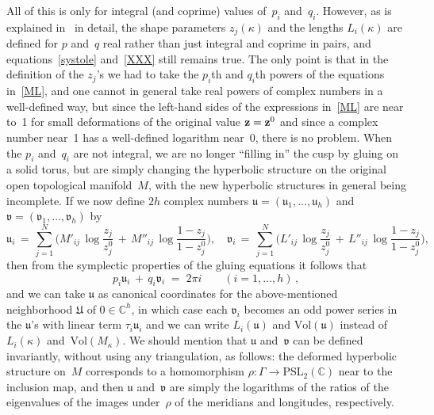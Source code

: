 \documentclass[12pt,reqno]{amsart}
\theoremstyle{definition}
\def\G{\Gamma}
\def\PSL{\mathrm{PSL}}
\def\Vol{\mathrm{Vol}}
\def\k{\kappa}
\def\={\;=\;}
\def\+{\,+\,}
\def\C{\mathbb C}
\def\fu{\mathfrak u}   %
\def\fv{\mathfrak v}   %
\def\fU{\mathfrak U}   %
\begin{document}
All of this is only for integral (and coprime) values of~$p_i$ and~$q_i$.  However, as is 
explained in~\cite{NZ} in detail, the shape parameters $z_j(\k)$ and the lengths $L_i(\k)$ 
are defined for $p$ and~$q$ real rather than just integral and coprime in pairs, and
equations~\eqref{systole} and~\eqref{XXX} still remains true.  The only point is that in
the definition of the $z_j$'s we had to take the $p_i$th and $q_i$th powers of the
equations in~\eqref{ML}, and one cannot in general take real powers of complex numbers
in a well-defined way, but since the left-hand sides of the expressions in~\eqref{ML}
are near to~1 for small deformations of the original value $\mathbf z=\mathbf z^0$ and since a
complex number near~1 has a well-defined logarithm near~0, there is no problem.  When the
$p_i$ and~$q_i$ are not integral, we are no longer ``filling in'' the cusp by gluing on
a solid torus, but are simply changing the hyperbolic structure on the original
open topological manifold~$M$, with the new  hyperbolic structures in general being
incomplete. 
If we now define $2h$ complex numbers $\fu=(\fu_1,\dots,\fu_h)$ and
$\fv=(\fv_1,\dots,\fv_h)$ by
$$ 
\fu_i\,=\,\sum_{j=1}^N\biggl(M'_{ij}\,\log\frac{z_j}{z_j^0}
\+M''_{ij}\,\log\frac{1-z_j}{1-z_j^0}\biggr),\quad
\fv_i\,=\,\sum_{j=1}^N\biggl(L'_{ij}\,
\log\frac{z_j}{z_j^0}\+L''_{ij}\,\log\frac{1-z_j}{1-z_j^0}\biggr),
$$
then from the symplectic properties of the gluing equations it follows
that~\cite[Lem.4.1]{N:combinatorics} 
$$ 
p_i\fu_i \+ q_i\fv_i\= 2\pi i\qquad(i=1,\dots,h)\,, 
$$
and we can take $\fu$ as canonical coordinates for the above-mentioned neighborhood $\fU$ 
of $0\in\C^h$, 
in which case each $\fv_i$ becomes an odd power series in the $\fu$'s with linear term 
$\tau_i\fu_i$
and we can write $L_i(\fu)$ and $\Vol(\fu)$ instead of $L_i(\k)$ and~$\Vol(M_\k)$.  
We should mention
that $\fu$ and~$\fv$ can be defined invariantly, without using any triangulation, 
as follows: the deformed
hyperbolic structure on~$M$ corresponds to a homomorphism $\rho:\G\to\PSL_2(\C)$ near to 
the inclusion
map, and then $\fu$ and~$\fv$ are simply the logarithms of the ratios of the eigenvalues of 
the images under~$\rho$ of the meridians and longitudes, respectively.
\end{document}
